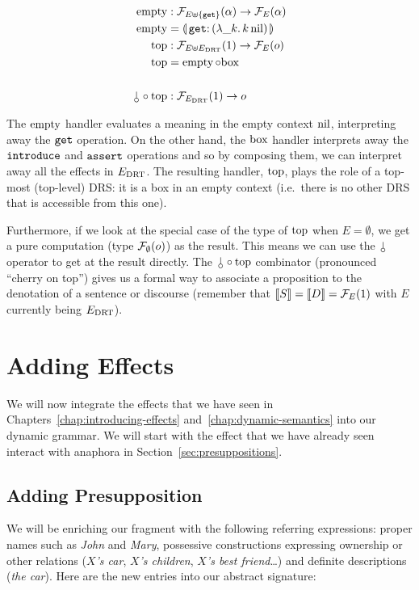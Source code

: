 \begin{align*}
  \EMPTY &: \FF_{E \uplus \{\op{get}\}}(\alpha) \to \FF_E(\alpha) \\
  \EMPTY &= \banana{\onto{\op{get}}{(\lam{\_ k}{\ap{k}{\nil}})}} \\
  \TOP &: \FF_{E \uplus E_\DRT}(1) \to \FF_{E}(o) \\
  \TOP &= \EMPTY \comp \BOX \\
  \\
  \cherry \comp \TOP &: \FF_{E_\DRT}(1) \to o
\end{align*}

The $\operatorname{empty}$ handler evaluates a meaning in the empty context $\mathrm{nil}$,
interpreting away the $\mathtt{get}$ operation. On the other hand, the $\mathrm{box}$
handler interprets away the $\mathtt{introduce}$ and $\mathtt{assert}$ operations
and so by composing them, we can interpret away all the effects in
$E_{\mathrm{DRT}}$. The resulting handler, $\mathrm{top}$, plays the role of a top-most
(top-level) DRS: it is a box in an empty context (i.e.\ there is no other
DRS that is accessible from this one).

Furthermore, if we look at the special case of the type of $\mathrm{top}$ when
$E = \emptyset$, we get a pure computation (type $\mathcal{F}_\emptyset(o)$) as the
result. This means we can use the $\cherry$ operator to get at the result
directly. The $\cherry \comp \TOP$ combinator (pronounced ``cherry on
top'') gives us a formal way to associate a proposition to the denotation
of a sentence or discourse (remember that $\llbracket S \rrbracket = \llbracket D \rrbracket = \mathcal{F}_E(1)$
with $E$ currently being $E_{\mathrm{DRT}}$).


\section{Adding Effects}
\label{sec:adding-effects}

We will now integrate the effects that we have seen in
Chapters~\ref{chap:introducing-effects} and~\ref{chap:dynamic-semantics}
into our dynamic grammar. We will start with the effect that we have
already seen interact with anaphora in Section~\ref{sec:presuppositions}.


\subsection{Adding Presupposition}
\label{ssec:adding-presupposition}

We will be enriching our fragment with the following referring expressions:
proper names such as \emph{John} and \emph{Mary}, possessive constructions
expressing ownership or other relations (\emph{$X$'s car}, \emph{$X$'s
  children}, \emph{$X$'s best friend}\ldots) and definite descriptions
(\emph{the car}). Here are the new entries into our abstract signature:

